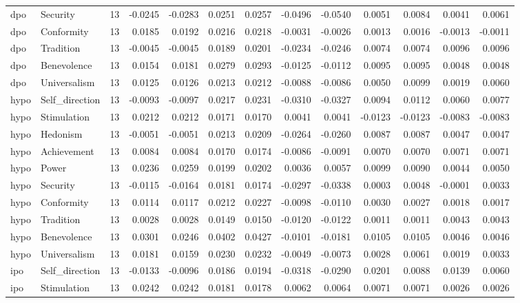 \begin{tabular}{llrrrrrrrrrrr}
dpo & Security & 13 & -0.0245 & -0.0283 & 0.0251 & 0.0257 & -0.0496 & -0.0540 & 0.0051 & 0.0084 & 0.0041 & 0.0061 \\
dpo & Conformity & 13 & 0.0185 & 0.0192 & 0.0216 & 0.0218 & -0.0031 & -0.0026 & 0.0013 & 0.0016 & -0.0013 & -0.0011 \\
dpo & Tradition & 13 & -0.0045 & -0.0045 & 0.0189 & 0.0201 & -0.0234 & -0.0246 & 0.0074 & 0.0074 & 0.0096 & 0.0096 \\
dpo & Benevolence & 13 & 0.0154 & 0.0181 & 0.0279 & 0.0293 & -0.0125 & -0.0112 & 0.0095 & 0.0095 & 0.0048 & 0.0048 \\
dpo & Universalism & 13 & 0.0125 & 0.0126 & 0.0213 & 0.0212 & -0.0088 & -0.0086 & 0.0050 & 0.0099 & 0.0019 & 0.0060 \\
hypo & Self\_direction & 13 & -0.0093 & -0.0097 & 0.0217 & 0.0231 & -0.0310 & -0.0327 & 0.0094 & 0.0112 & 0.0060 & 0.0077 \\
hypo & Stimulation & 13 & 0.0212 & 0.0212 & 0.0171 & 0.0170 & 0.0041 & 0.0041 & -0.0123 & -0.0123 & -0.0083 & -0.0083 \\
hypo & Hedonism & 13 & -0.0051 & -0.0051 & 0.0213 & 0.0209 & -0.0264 & -0.0260 & 0.0087 & 0.0087 & 0.0047 & 0.0047 \\
hypo & Achievement & 13 & 0.0084 & 0.0084 & 0.0170 & 0.0174 & -0.0086 & -0.0091 & 0.0070 & 0.0070 & 0.0071 & 0.0071 \\
hypo & Power & 13 & 0.0236 & 0.0259 & 0.0199 & 0.0202 & 0.0036 & 0.0057 & 0.0099 & 0.0090 & 0.0044 & 0.0050 \\
hypo & Security & 13 & -0.0115 & -0.0164 & 0.0181 & 0.0174 & -0.0297 & -0.0338 & 0.0003 & 0.0048 & -0.0001 & 0.0033 \\
hypo & Conformity & 13 & 0.0114 & 0.0117 & 0.0212 & 0.0227 & -0.0098 & -0.0110 & 0.0030 & 0.0027 & 0.0018 & 0.0017 \\
hypo & Tradition & 13 & 0.0028 & 0.0028 & 0.0149 & 0.0150 & -0.0120 & -0.0122 & 0.0011 & 0.0011 & 0.0043 & 0.0043 \\
hypo & Benevolence & 13 & 0.0301 & 0.0246 & 0.0402 & 0.0427 & -0.0101 & -0.0181 & 0.0105 & 0.0105 & 0.0046 & 0.0046 \\
hypo & Universalism & 13 & 0.0181 & 0.0159 & 0.0230 & 0.0232 & -0.0049 & -0.0073 & 0.0028 & 0.0061 & 0.0019 & 0.0033 \\
ipo & Self\_direction & 13 & -0.0133 & -0.0096 & 0.0186 & 0.0194 & -0.0318 & -0.0290 & 0.0201 & 0.0088 & 0.0139 & 0.0060 \\
ipo & Stimulation & 13 & 0.0242 & 0.0242 & 0.0181 & 0.0178 & 0.0062 & 0.0064 & 0.0071 & 0.0071 & 0.0026 & 0.0026 \\

\end{tabular}
